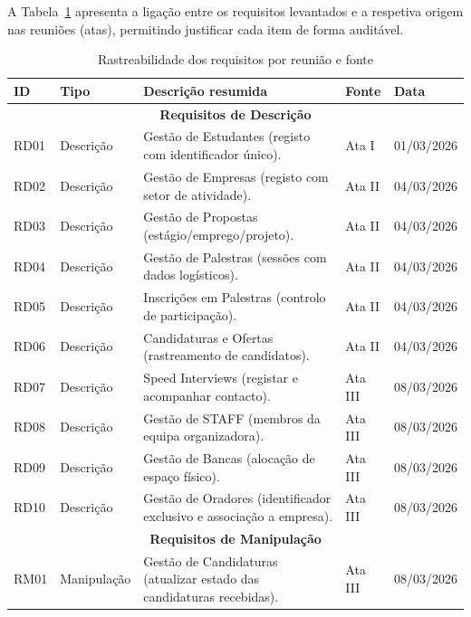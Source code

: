 \documentclass[12pt,a4paper]{article}
\begin{document}
A Tabela~\ref{tab:rastreabilidade} apresenta a ligação entre os requisitos
levantados e a respetiva origem nas reuniões (atas), permitindo justificar cada
item de forma auditável.

\begin{table}[H]
    \centering
    \caption{Rastreabilidade dos requisitos por reunião e fonte}
    \label{tab:rastreabilidade}
    \tiny
    \begin{tabular}{|l|l|p{5.5cm}|l|l|}
        \hline
        \textbf{ID} & \textbf{Tipo} & \textbf{Descrição resumida} & \textbf{Fonte} & \textbf{Data} \\
        \hline
        \multicolumn{5}{|c|}{\textbf{Requisitos de Descrição}} \\
        \hline
        RD01 & Descrição & Gestão de Estudantes (registo com identificador único). & Ata I & 01/03/2026 \\
        \hline
        RD02 & Descrição & Gestão de Empresas (registo com setor de atividade). & Ata II & 04/03/2026 \\
        \hline
        RD03 & Descrição & Gestão de Propostas (estágio/emprego/projeto). & Ata II & 04/03/2026 \\
        \hline
        RD04 & Descrição & Gestão de Palestras (sessões com dados logísticos). & Ata II & 04/03/2026 \\
        \hline
        RD05 & Descrição & Inscrições em Palestras (controlo de participação). & Ata II & 04/03/2026 \\
        \hline
        RD06 & Descrição & Candidaturas e Ofertas (rastreamento de candidatos). & Ata II & 04/03/2026 \\
        \hline
        RD07 & Descrição & Speed Interviews (registar e acompanhar contacto). & Ata III & 08/03/2026 \\
        \hline
        RD08 & Descrição & Gestão de STAFF (membros da equipa organizadora). & Ata III & 08/03/2026 \\
        \hline
        RD09 & Descrição & Gestão de Bancas (alocação de espaço físico). & Ata III & 08/03/2026 \\
        \hline
        RD10 & Descrição & Gestão de Oradores (identificador exclusivo e associação a empresa). & Ata III & 08/03/2026 \\
        \hline
        \multicolumn{5}{|c|}{\textbf{Requisitos de Manipulação}} \\
        \hline
        RM01 & Manipulação & Gestão de Candidaturas (atualizar estado das candidaturas recebidas). & Ata III & 08/03/2026 \\

\end{tabular}
\end{table}
\end{document}
